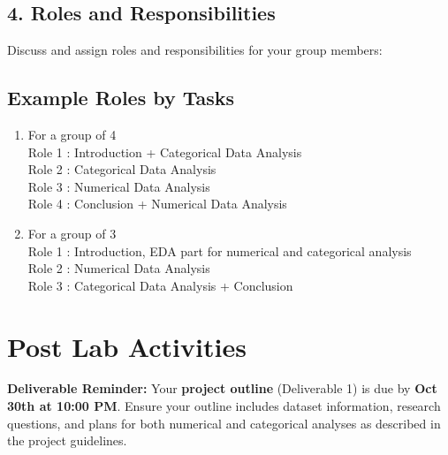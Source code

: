 \documentclass[12pt]{article}
\begin{document}
\vspace{6\baselineskip}

\subsection*{4. Roles and Responsibilities}
Discuss and assign roles and responsibilities for your group members:

\subsection*{Example Roles by Tasks}
\begin{enumerate}
    \item For a group of 4 \\
    Role 1 : Introduction + Categorical Data Analysis   \\
    Role 2 : Categorical Data Analysis \\
    Role 3 : Numerical Data Analysis \\
    Role 4 : Conclusion + Numerical Data Analysis  \\
    \vspace{1em}

    \item For a group of 3 \\
    Role 1 : Introduction, EDA part for numerical and categorical analysis \\
    Role 2 : Numerical Data Analysis \\
    Role 3 : Categorical Data Analysis + Conclusion \\
\end{enumerate}

\vspace{6\baselineskip}

\section*{Post Lab Activities}

\noindent \textbf{Deliverable Reminder:}  
Your \textbf{project outline} (Deliverable 1) is due by \textbf{Oct 30th at 10:00 PM}.  
Ensure your outline includes dataset information, research questions, and plans for both numerical and categorical analyses as described in the project guidelines.
\end{document}
